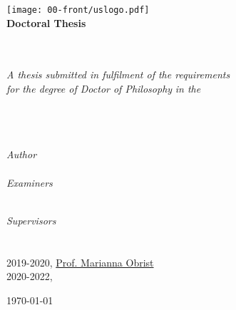 \thispagestyle{empty}
\begin{center}

		\texttt{[image: 00-front/uslogo.pdf]}\\[1cm]%

		\textbf{\Large Doctoral Thesis}
	

		\Huge \textbf{\myTitle}\\[0.5cm] %
        \large \textbf{\mySubtitle}\\[2cm]
		\large \textit{A thesis submitted in fulfilment of the requirements\\ for the degree of Doctor of Philosophy} %
		\textit{in the}\\[1.2cm]
		\myDepartment\\ \myFaculty\\ \myUni\\[0.4cm]
		\vspace*{0.25cm}
		\begin{minipage}[t]{.39\linewidth}
			\begin{flushleft} %
			\emph{Author}\\
			\href{\myNameLink}{\myName}\\
			\emph{Examiners}\\
			\href{https://profiles.sussex.ac.uk/p145629-mary-agnes-krell/}{\myFirstExaminer} 	\\
			\href{https://frederic-bevilacqua.net/bio/bio-in-english/}{\mySecondExaminer}
			\end{flushleft}
		\end{minipage}
		\begin{minipage}[t]{.59\linewidth}
			\begin{flushright} %
			\emph{Supervisors}\\
			\href{https://profiles.sussex.ac.uk/p208667-chris-kiefer/}{\myFirstSupervisor} 		\\
			\href{https://profiles.sussex.ac.uk/p235751-cecile-chevalier/}{\mySecondSupervisor} \\
			2019-2020, \href{https://uclic.ucl.ac.uk/people/marianna-obrist}{Prof. Marianna Obrist} \\
			2020-2022, \href{https://profiles.sussex.ac.uk/p92444-jamie-ward}{\myThirdSupervisor}
			\end{flushright}
		\end{minipage}
		\vfill
		\large \today
	\end{center}
